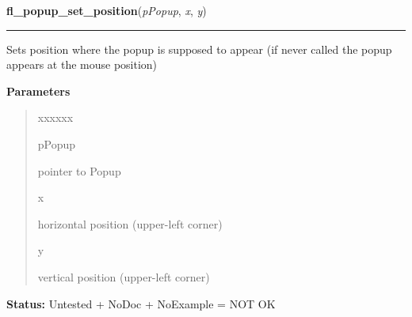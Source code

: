     \label{xformslib:library:fl_popup_set_position}

    \vspace{0.5ex}

\hspace{.8\funcindent}\begin{boxedminipage}{\funcwidth}

    \raggedright \textbf{fl\_popup\_set\_position}(\textit{pPopup}, \textit{x}, \textit{y})

    \vspace{-1.5ex}

    \rule{\textwidth}{0.5\fboxrule}
\setlength{\parskip}{2ex}
    Sets position where the popup is supposed to appear (if never called 
    the popup appears at the mouse position)

\setlength{\parskip}{1ex}
      \textbf{Parameters}
      \vspace{-1ex}

      \begin{quote}
        \begin{Ventry}{xxxxxx}

          \item[pPopup]

          pointer to Popup

          \item[x]

          horizontal position (upper-left corner)

          \item[y]

          vertical position (upper-left corner)

        \end{Ventry}

      \end{quote}

\textbf{Status:} Untested + NoDoc + NoExample = NOT OK



    \end{boxedminipage}

    \label{xformslib:library:fl_popup_get_policy}

    \vspace{0.5ex}

